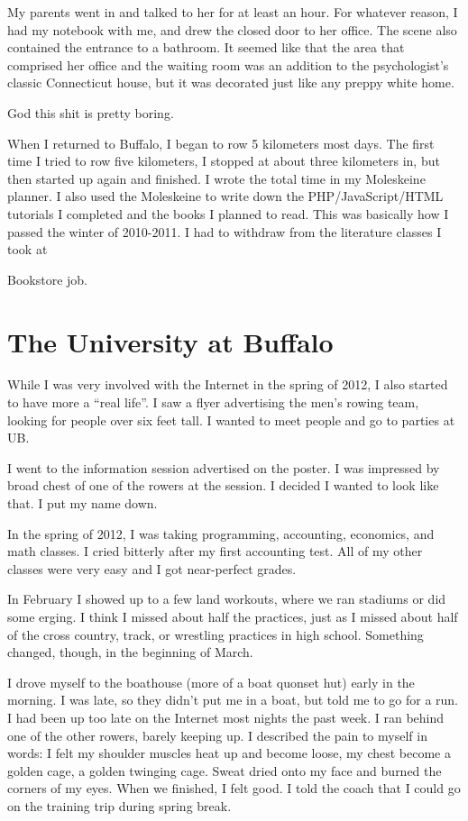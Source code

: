 \documentclass[12pt]{article}
\begin{document}
My parents went in and talked to her for at least an hour.  For whatever reason,
I had my notebook with me, and drew the closed door to her office.  The scene
also contained the entrance to a bathroom.  It seemed like that the area that
comprised her office and the waiting room was an addition to the psychologist's
classic Connecticut house, but it was decorated just like any preppy white home.

God this shit is pretty boring.

When I returned to Buffalo, I began to row 5 kilometers most days.  The first
time I tried to row five kilometers, I stopped at about three kilometers in, but
then started up again and finished.  I wrote the total time in my Moleskeine
planner.  I also used the Moleskeine to write down the PHP/JavaScript/HTML
tutorials I completed and the books I planned to read.  This was basically how I
passed the winter of 2010-2011.  I had to withdraw from the literature classes I
took at 

Bookstore job.  

\section{The University at Buffalo}
While I was very involved with the Internet in the spring of 2012, I also
started to have more a ``real life''.  I saw a flyer advertising the men's
rowing team, looking for people over six feet tall.   I wanted to
meet people and go to parties at UB. 

I went to the information session advertised on the poster.  I was impressed by
 broad chest of one of the rowers at the session.  I decided I
wanted to look like that.  I put my name down.

In the spring of 2012, I was taking programming, accounting, economics, and
math classes.  I cried bitterly after my first accounting test.  All of my
other classes were very easy and I got near-perfect grades.

In February I showed up to a few land workouts, where we ran stadiums or did
some erging.  I think I missed about half the practices, just as I missed about
half of the cross country, track, or wrestling practices in high school.
Something changed, though, in the beginning of March.

I drove myself to the boathouse (more of a boat quonset hut) early in the
morning.  I was late, so they didn't put me in a boat, but told me to go for a
run.  I had been up too late on the Internet most nights the past week.  I ran
behind one of the other rowers, barely keeping up.  I described the pain to
myself in words: I felt my shoulder muscles heat up and become loose, my chest
become a golden cage, a golden twinging cage.  Sweat dried onto my face and
burned the corners of my eyes.  When we finished, I felt good.  I told the coach
that I could go on the training trip during spring break.  
\end{document}
